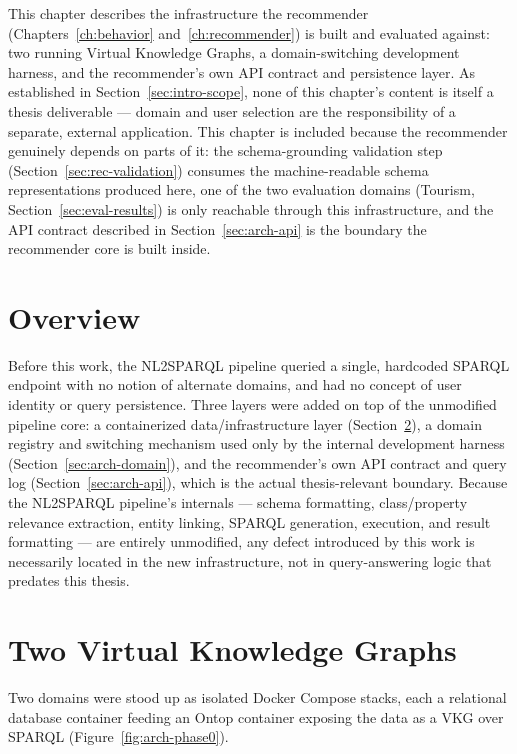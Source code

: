 \documentclass[11pt,a4paper,oneside]{book}
\begin{document}
This chapter describes the infrastructure the recommender (Chapters~\ref{ch:behavior}
and~\ref{ch:recommender}) is built and evaluated against: two running Virtual Knowledge Graphs, a
domain-switching development harness, and the recommender's own API contract and persistence
layer. As established in Section~\ref{sec:intro-scope}, none of this chapter's content is itself a
thesis deliverable --- domain and user selection are the responsibility of a separate, external
application. This chapter is included because the recommender genuinely depends on parts of it: the
schema-grounding validation step (Section~\ref{sec:rec-validation}) consumes the machine-readable
schema representations produced here, one of the two evaluation domains (Tourism,
Section~\ref{sec:eval-results}) is only reachable through this infrastructure, and the API contract
described in Section~\ref{sec:arch-api} is the boundary the recommender core is built inside.

\section{Overview}
\label{sec:arch-overview}

Before this work, the NL2SPARQL pipeline queried a single, hardcoded SPARQL endpoint with no
notion of alternate domains, and had no concept of user identity or query persistence. Three layers
were added on top of the unmodified pipeline core: a containerized data/infrastructure layer
(Section~\ref{sec:arch-vkgs}), a domain registry and switching mechanism used only by the internal
development harness (Section~\ref{sec:arch-domain}), and the recommender's own API contract and
query log (Section~\ref{sec:arch-api}), which is the actual thesis-relevant boundary. Because the
NL2SPARQL pipeline's internals --- schema formatting, class/property relevance extraction, entity
linking, SPARQL generation, execution, and result formatting --- are entirely unmodified, any defect
introduced by this work is necessarily located in the new infrastructure, not in query-answering
logic that predates this thesis.

\section{Two Virtual Knowledge Graphs}
\label{sec:arch-vkgs}

Two domains were stood up as isolated Docker Compose stacks, each a relational database container
feeding an Ontop container exposing the data as a VKG over SPARQL (Figure~\ref{fig:arch-phase0}).
\end{document}
